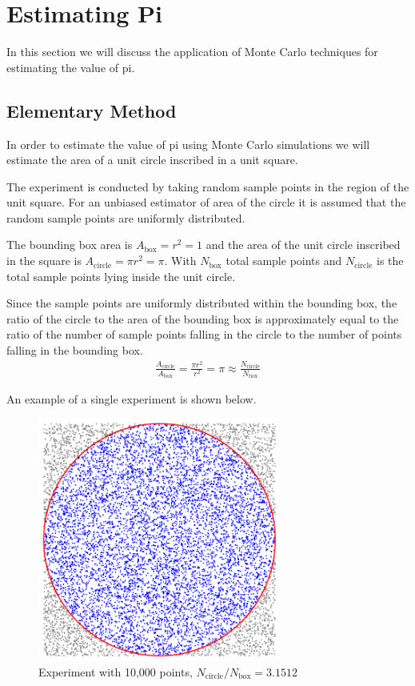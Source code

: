 \documentclass[12pt]{article}
\numberwithin{equation}{section}
\begin{document}
\section{Estimating Pi}
In this section we will discuss the application of  Monte  Carlo  techniques  for  estimating  the  value  of  pi.

\subsection{Elementary Method}
In order to estimate the value of pi using Monte Carlo simulations we will estimate the area of a unit circle inscribed in a unit square.
\par
The  experiment is  conducted by taking random sample points in the region of the unit square. For  an unbiased estimator of area of the circle it is assumed  that the  random sample  points are uniformly distributed.
\par
The bounding box area is  $A_{\text{box}}=r^2=1$ and the area of the unit circle inscribed in the square is $A_{\text{circle}}=\pi r^2=\pi$. With $N_{\text{box}}$ total sample points and $N_{\text{circle}}$ is the total sample points lying inside the unit circle.
\par
Since the sample points are uniformly distributed within the bounding box, the ratio of the circle to the area of the  bounding  box is  approximately  equal  to  the ratio  of the number  of  sample  points  falling  in  the circle to the number of points falling in the bounding box.
\begin{align}
   \frac{A_{\text{circle}}}{A_{\text{box}}}=\frac{\pi r^2}{r^2}=\pi\approx \frac{N_{\text{circle}}}{N_{\text{box}}} 
\end{align}
\par An example of a single experiment is shown below.
\begin{figure}[!htb]
    \centering
    \includegraphics[width=8cm]{Images/piexample.png}
    \caption{Experiment with 10,000 points, $N_{\text{circle}}/N_{\text{box}}=3.1512$}
    \label{fig:piexample}
\end{figure}\par
\end{document}
